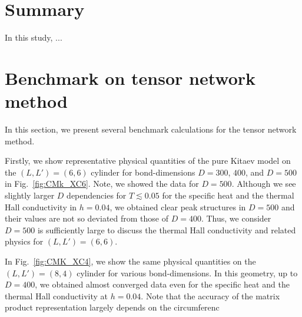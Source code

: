 \documentclass[reprint,amsmath,amssymb,aps,prx]{revtex4-2}
\begin{document}
  
\section{Summary}
In this study, ...


\appendix

\section{Benchmark on tensor network method}
\label{sec:XTRG_Bench}
In this section, we present several benchmark calculations for the tensor network method. 

Firstly, we show representative physical quantities of the pure Kitaev model on the $(L, L') = (6, 6)$ cylinder for bond-dimensions $D=300$, $400$, and $D=500$ in Fig.~\ref{fig:CMk_XC6}. Note, we showed the data for $D=500$. Although we see slightly larger $D$ dependencies for $T \lesssim 0.05$  for the specific heat and the thermal Hall conductivity in $h=0.04$, we obtained clear peak structures in $D=500$ and their values are not so deviated from those of $D=400$. Thus, we consider $D=500$ is sufficiently large to discuss the thermal Hall conductivity and related physics for $(L, L') = (6, 6)$.

In Fig.~\ref{fig:CMK_XC4}, we show the same physical quantities on the $(L, L') = (8, 4)$ cylinder for various bond-dimensions. In this geometry, up to $D=400$, we obtained almost converged data even for the specific heat and the thermal Hall conductivity at $h=0.04$. Note that the accuracy of the matrix product representation largely depends on the circumferenc
\end{document}
